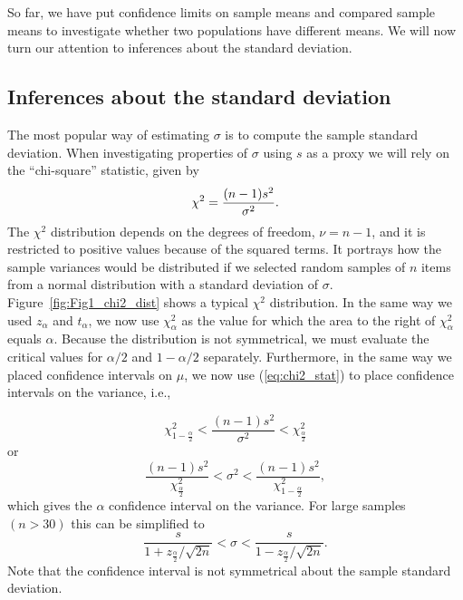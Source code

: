 So far, we have put confidence limits on sample means and compared sample means 
to investigate whether two populations have different means.  We will now turn our attention to 
inferences about the standard deviation.

\subsection{Inferences about the standard deviation}


The most popular way of estimating $\sigma$ is to compute the sample standard deviation.  When 
investigating properties of $\sigma$ using $s$ as a proxy we will rely on the ``chi-square'' statistic, given by
\begin{equation}
	\index{$\chi^2$ statistic (``chi-squared'')}
	\index{Chi-squared statistic ($\chi^2$)}
	\index{Probability distribution!Chi-squared}
	\index{Probability distribution!$\chi^2$}
\chi^2=\frac{(n-1)s^2}{\sigma^2}.
\label{eq:chi2_stat}	 	
\end{equation}
The $\chi^2$ distribution depends on the degrees of freedom, $\nu = n - 1$, and it is restricted to positive 
values because of the squared terms.  It portrays how the sample variances would be 
distributed if we selected random samples of $n$ items from a normal distribution with a standard deviation of $\sigma$.
Figure~\ref{fig:Fig1_chi2_dist} shows a typical $\chi^2$ distribution.
In the same way we used $z_\alpha$ and $t_\alpha$, we now use $\chi^2_\alpha$ as the value for which the area to the right 
of $\chi^2_\alpha$ equals $\alpha$.  Because the distribution is not symmetrical, we must evaluate the
critical values for $\alpha/2$ and $1 - \alpha/2$ separately.
Furthermore, in the same way we placed confidence intervals on $\mu$, we now 
use (\ref{eq:chi2_stat}) to place confidence intervals on the variance, i.e.,

\begin{equation}
\chi^2_{1-\frac{\alpha}{2}}<\frac{(n-1)s^2}{\sigma^2}<\chi^2_\frac{\alpha}{2}
\end{equation}	 
or
\begin{equation}	 
\frac{(n-1)s^2}{\chi^2_\frac{\alpha}{2}}<\sigma^2<\frac{(n-1)s^2}{\chi^2_{1-\frac{\alpha}{2}}},
\end{equation}
which gives the $\alpha$ confidence interval on the variance.  For large samples $(n > 30)$ this can be 
simplified to 
\begin{equation}
\frac{s}{1+{z_\frac{\alpha}{2}/\sqrt{2n}}}<\sigma<\frac{s}{1-{z_\frac{\alpha}{2}/\sqrt{2n}}}.
\end{equation}
Note that the confidence interval is not symmetrical about the sample standard deviation.

